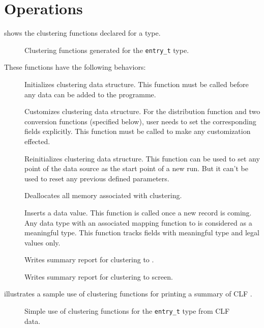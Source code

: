 \section{Operations}
 shows the clustering functions declared 
for a \pads{} type.
\begin{figure}
\caption{Clustering functions generated for the \texttt{entry\_t} type.}
\label{figure:cluster}
\end{figure}
%
These functions have the following behaviors:
\begin{description}
\item[] Initializes clustering data
  structure. This function must be called before any data can be added
  to the programme.
\item[] Customizes clustering data
  structure. For the distribution function and two conversion
  functions (specified below), user needs to set the corresponding 
  fields explicitly. This function must be called to make any 
  customization effected.  
\item[] Reinitializes clustering data
  structure. This function can be used to set any point of the data
  source as the start point of a new run. But it can't be used to 
  reset any previous defined parameters.
\item[] Deallocates all memory associated
  with clustering.
\item[] Inserts a data value. This function 
  is called once a new record is coming. Any data type with an
  associated mapping function to  is considered as a 
  meaningful type. This function tracks fields with meaningful type
  and legal values only.
\item[] Writes summary report for
  clustering  to . 
\item[] Writes summary report for
  clustering  to screen. 
\end{description}
 illustrates a sample use of clustering
functions for printing a summary of CLF .  
\begin{figure}
\caption{Simple use of clustering functions for the
  \texttt{entry\_t} type from CLF data.}
\label{figure:wsl-cluster-hand}
\end{figure}

